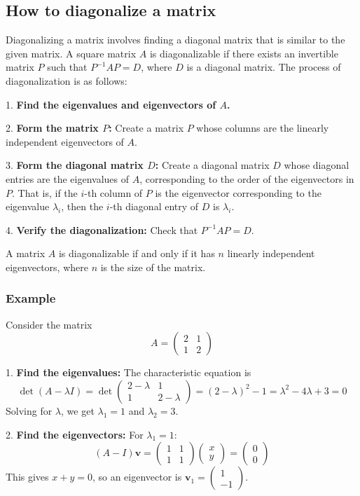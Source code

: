 \subsection{How to diagonalize a matrix}

Diagonalizing a matrix involves finding a diagonal matrix that is similar to the given matrix. A square matrix \(A\) is diagonalizable if there exists an invertible matrix \(P\) such that \(P^{-1}AP = D\), where \(D\) is a diagonal matrix.
The process of diagonalization is as follows:

 1.  \textbf{Find the eigenvalues and eigenvectors of \(A\).\/}

 2.  \textbf{Form the matrix \(P\):}
    Create a matrix \(P\) whose columns are the linearly independent eigenvectors of \(A\).

     3.  \textbf{Form the diagonal matrix \(D\):}
    Create a diagonal matrix \(D\) whose diagonal entries are the eigenvalues of \(A\), corresponding to the order of the eigenvectors in \(P\). That is, if the \(i\)-th column of \(P\) is the eigenvector corresponding to the eigenvalue \(\lambda_i\), then the \(i\)-th diagonal entry of \(D\) is \(\lambda_i\).

     4.  \textbf{Verify the diagonalization:}
    Check that \(P^{-1}AP = D\).

A matrix \(A\) is diagonalizable if and only if it has \(n\) linearly independent eigenvectors, where \(n\) is the size of the matrix.

\subsubsection*{Example}

Consider the matrix
\[
A = \begin{pmatrix}
2 & 1 \\
1 & 2
\end{pmatrix}
\]

1.  \textbf{Find the eigenvalues:}
    The characteristic equation is
    \[
    \det(A - \lambda I) = \det \begin{pmatrix}
    2 - \lambda & 1 \\
    1 & 2 - \lambda
    \end{pmatrix} = (2 - \lambda)^2 - 1 = \lambda^2 - 4\lambda + 3 = 0
    \]
    Solving for \(\lambda\), we get \(\lambda_1 = 1\) and \(\lambda_2 = 3\).

2.  \textbf{Find the eigenvectors:}
    For \(\lambda_1 = 1\):
    \[
    (A - I)\mathbf{v} = \begin{pmatrix}
    1 & 1 \\
    1 & 1
    \end{pmatrix} \begin{pmatrix}
    x \\
    y
    \end{pmatrix} = \begin{pmatrix}
    0 \\
    0
    \end{pmatrix}
    \]
    This gives \(x + y = 0\), so an eigenvector is \(\mathbf{v}_1 = \begin{pmatrix} 1 \\ -1 \end{pmatrix}\).

